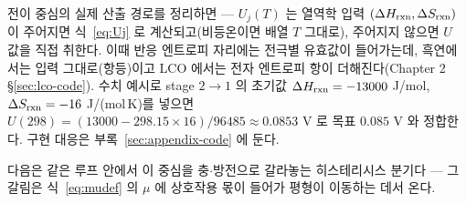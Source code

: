 전이 중심의 실제 산출 경로를 정리하면 --- $U_j(T)$ 는 열역학 입력 $(\Delta H_{\mathrm{rxn}},\Delta S_{\mathrm{rxn}})$ 이 주어지면
식~\eqref{eq:Uj} 로 계산되고(비등온이면 배열 $T$ 그대로), 주어지지 않으면 $U$ 값을 직접 취한다. 이때
반응 엔트로피 자리에는 전극별 유효값이 들어가는데, 흑연에서는 입력 그대로(항등)이고 LCO 에서는 전자
엔트로피 항이 더해진다(Chapter 2 \S\ref{sec:lco-code}). 수치 예시로 stage $2\to1$ 의 초기값
$\Delta H_{\mathrm{rxn}}=-13000$ J/mol, $\Delta S_{\mathrm{rxn}}=-16$ J/(mol\,K)를 넣으면
$U(298)=(13000-298.15\times16)/96485\approx0.0853$ V 로 목표 $0.085$ V 와 정합한다. 구현 대응은
부록~\ref{sec:appendix-code} 에 둔다.

다음은 같은 루프 안에서 이 중심을 충$\cdot$방전으로 갈라놓는 히스테리시스 분기다 --- 그 갈림은 식~\eqref{eq:mudef} 의
$\mu$ 에 상호작용 몫이 들어가 평형이 이동하는 데서 온다.

